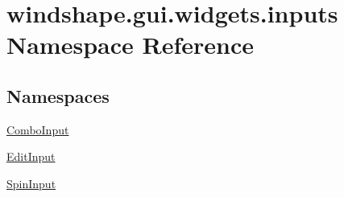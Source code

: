 \hypertarget{namespacewindshape_1_1gui_1_1widgets_1_1inputs}{}\section{windshape.\+gui.\+widgets.\+inputs Namespace Reference}
\label{namespacewindshape_1_1gui_1_1widgets_1_1inputs}
\subsection*{Namespaces}
\begin{DoxyCompactItemize}
\item 
 \mbox{\hyperlink{namespacewindshape_1_1gui_1_1widgets_1_1inputs_1_1_combo_input}{Combo\+Input}}
\item 
 \mbox{\hyperlink{namespacewindshape_1_1gui_1_1widgets_1_1inputs_1_1_edit_input}{Edit\+Input}}
\item 
 \mbox{\hyperlink{namespacewindshape_1_1gui_1_1widgets_1_1inputs_1_1_spin_input}{Spin\+Input}}
\end{DoxyCompactItemize}
